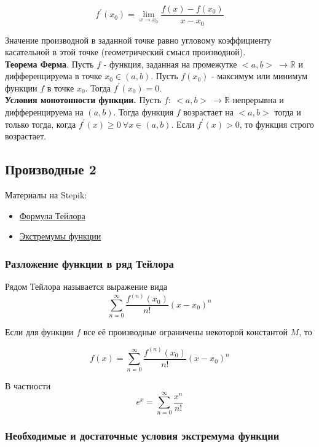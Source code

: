 \documentclass{article}
\begin{document}
$$ f^{\prime}(x_0) = \lim\limits_{x \to x_0} \frac{f(x) - f(x_0)}{x - x_0} $$

Значение производной в заданной точке равно угловому коэффициенту касательной в этой точке (геометрический смысл производной). \\

\textbf{Теорема Ферма}. Пусть $f$ - функция, заданная на промежутке $<a, b> \ \to \mathbb{R}$ и дифференцируема в точке $x_0 \in (a, b)$. Пусть $f(x_0)$ - максимум или минимум функции $f$ в точке $x_0$. Тогда $f^{\prime}(x_0) = 0$. \\

\textbf{Условия монотонности функции.} Пусть $f: \ <a, b> \ \to \mathbb{R}$ непрерывна и дифференцируема на $(a, b)$. Тогда функция $f$ возрастает на $<a, b>$ тогда и только тогда, когда $f^{\prime}(x) \ge 0 \ \forall x \in (a, b)$. Если $f^{\prime}(x) > 0$, то функция строго возрастает.

\subsection{Производные 2}

Материалы на Stepik:

\begin{itemize}
	\item \href{https://stepik.org/lesson/32797/step/1}{Формула Тейлора}
	\item \href{https://stepik.org/lesson/28372/step/2}{Экстремумы функции}
\end{itemize}

\subsubsection{Разложение функции в ряд Тейлора}

Рядом Тейлора называется выражение вида $$ \sum_{n = 0}^{\infty} \frac{f^{(n)}(x_0)}{n!} (x - x_0)^n $$

Если для функции $f$ все её производные ограничены некоторой константой $M$, то 

$$ f(x) = \sum_{n = 0}^{\infty} \frac{f^{(n)}(x_0)}{n!} (x - x_0)^n $$

В частности $$e^x = \sum_{n = 0}^{\infty} \frac{x^n}{n!}$$

\subsubsection{Необходимые и достаточные условия экстремума функции}
\end{document}
